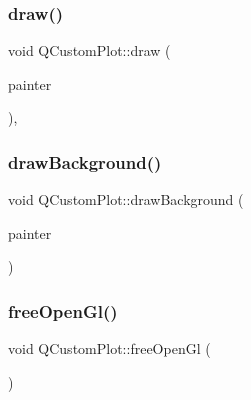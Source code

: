 \subsubsection{\texorpdfstring{draw()}{draw()}}
{\footnotesize\ttfamily void Q\+Custom\+Plot\+::draw (\begin{DoxyParamCaption}\item[{\mbox{\hyperlink{class_q_c_p_painter}{Q\+C\+P\+Painter}} $\ast$}]{painter }\end{DoxyParamCaption})\hspace{0.3cm}{\ttfamily [protected]}, {\ttfamily [virtual]}}

\mbox{\label{class_q_custom_plot_a05dd52438cee4353b18c1e53a439008d}} 
\subsubsection{\texorpdfstring{drawBackground()}{drawBackground()}}
{\footnotesize\ttfamily void Q\+Custom\+Plot\+::draw\+Background (\begin{DoxyParamCaption}\item[{\mbox{\hyperlink{class_q_c_p_painter}{Q\+C\+P\+Painter}} $\ast$}]{painter }\end{DoxyParamCaption})\hspace{0.3cm}{\ttfamily [protected]}}

\mbox{\label{class_q_custom_plot_aaa3073362074581a7b5905726b4a0067}} 
\subsubsection{\texorpdfstring{freeOpenGl()}{freeOpenGl()}}
{\footnotesize\ttfamily void Q\+Custom\+Plot\+::free\+Open\+Gl (\begin{DoxyParamCaption}{ }\end{DoxyParamCaption})\hspace{0.3cm}{\ttfamily [protected]}}

\mbox{\label{class_q_custom_plot_a6ecae130f684b25276fb47bd3a5875c6}} 
